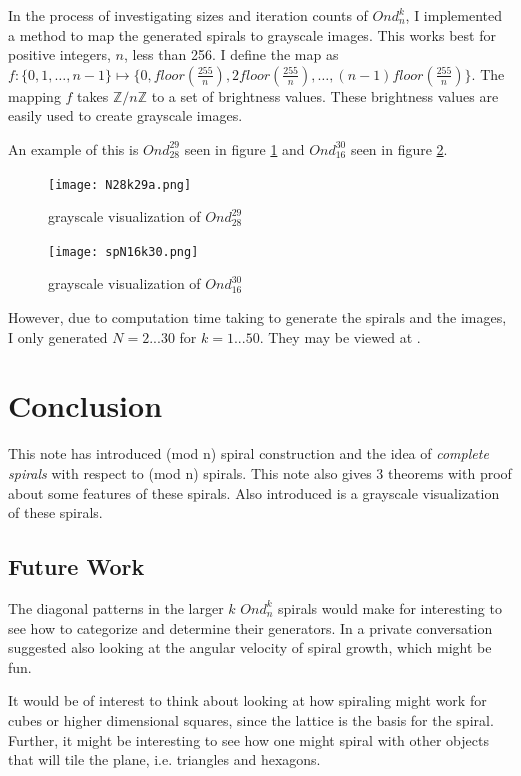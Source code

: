 \documentclass[11pt]{amsart}
\theoremstyle{mydef}
\begin{document}
In the process of investigating sizes and iteration counts of $Ond^k_n$, I implemented a method to map the generated spirals to grayscale images. This works best for positive integers, $n$, less than 256. I define the map as $f : \{ 0, 1, \ldots, n-1 \} \mapsto \{ 0, floor(\frac{255}{n}), 2floor(\frac{255}{n}), \ldots, (n-1)floor(\frac{255}{n}) \}$. The mapping $f$ takes $\mathbb{Z}/n\mathbb{Z}$ to a set of brightness values. These brightness values are easily used to create grayscale images.

An example of this is $Ond^{29}_{28}$ seen in figure \ref{fig:viz2928} and $Ond^{30}_{16}$ seen in figure \ref{fig:viz1630}.

\begin{figure}[h]
\centering
\texttt{[image: N28k29a.png]}
\caption{grayscale visualization of $Ond^{29}_{28}$}
\label{fig:viz2928}
\end{figure}

\begin{figure}
\centering
\texttt{[image: spN16k30.png]}
\caption{grayscale visualization of $Ond^{30}_{16}$}
\label{fig:viz1630}
\end{figure}

However, due to computation time taking to generate the spirals and the images, I only generated $N=2...30$ for $k=1...50$. They may be viewed at \cite{GraySquare}.

\section{Conclusion}
This note has introduced (mod n) spiral construction and the idea of \textit{complete spirals} with respect to (mod n) spirals. This note also gives 3 theorems with proof about some features of these spirals. Also introduced is a grayscale visualization of these spirals. 

\subsection{Future Work}
The diagonal patterns in the larger $k$ $Ond^k_n$ spirals would make for interesting to see how to categorize and determine their generators. In a private conversation \cite{Kusner} suggested also looking at the angular velocity of spiral growth, which might be fun.

It would be of interest to think about looking at how spiraling might work for cubes or higher dimensional squares, since the lattice is the basis for the spiral. Further, it might be interesting to see how one might spiral with other objects that will tile the plane, i.e. triangles and hexagons.
\end{document}
